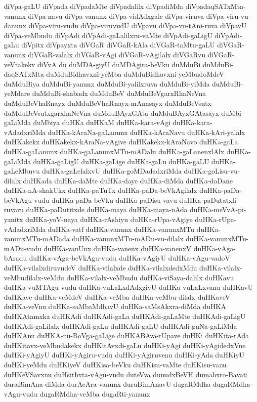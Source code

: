 {diVpa-gaLU
diVpada
diVpadaMte
diVpadalilx
diVpadiMda
diVpadaqSATxMta-vanunx
diVpa-navu
diVpa-vanunx
diVpa-vidAdxgale
diVpa-viruva
diVpa-viru-vu-danunx
diVpa-viru-vudu
diVpa-viruvudU
diVpavu
diVpa-vu-tAni-ruva
diVpavU
diVpa-veMbudu
diVpAdi
diVpAdi-gaLalilxru-vaMte
diVpAdi-gaLigU
diVpAdi-gaLu
diVpitx
diVpayxta
diVGaR
diVGaR-kAla
diVGaR-taMtu-gaLU
diVGaR-vanunx
diVGaR-valalx
diVGaR-vAgi
diVGaR-vAgilalx
diVGaRvu
diVGaR-veVtakekx
diVvA
du
duMDA-giyU
duMDAgira-beVku
duMduBi
duMduBi-daqSATxMta
duMduBidhavxni-yeMba
duMduBidhavxni-yeMbudoMdeV
duMduBiya
duMduBi-yanunx
duMduBi-yalilxruva
duMduBi-yiMda
duMduBi-yeMdare
duMduBi-shabadx
duMduBeV
duMduBeVgarxRhaNeVna
duMduBeVhaRnayx
duMduBeVhaRnayx-mAnasayx
duMduBeVsutx
duMduBeVsutxgarxhaNeVna
duMduBAyxGAta
duMduBAyxGAtasayx
duMbi-gaLiMda
duMbiya
duHKa
duHKaM
duHKa-kara-vAgi
duHKa-kara-vAdadxriMda
duHKa-kAraNa-gaLanunx
duHKa-kAraNavu
duHKa-kAri-yalalx
duHKakekx
duHKakekx-kAraNa-vAgive
duHKakekx-kAraNavo
duHKa-gaLa
duHKa-gaLanunx
duHKa-gaLanunxMTu-mADalu
duHKa-gaLanenxlAlx
duHKa-gaLiMda
duHKa-gaLigU
duHKa-gaLige
duHKa-gaLu
duHKa-gaLU
duHKa-gaLeMbuvu
duHKa-gaLelalxvU
duHKa-goMDadadxriMda
duHKa-goLisu-vu-dilalx
duHKada
duHKa-daMte
duHKa-daye
duHKa-diMda
duHKa-doDane
duHKa-nA-shakUkx
duHKa-paTuTx
duHKa-paDa-beVkAgilalx
duHKa-paDa-beVkAgu-vudu
duHKa-paDa-beVku
duHKa-paDisu-vavu
duHKa-paDutatxli-ruvaru
duHKa-paDutitxde
duHKa-maya
duHKa-maya-nAda
duHKa-meVvA-pi-yanitx
duHKa-yoV-naya
duHKa-rAshiyu
duHKa-rUpa-vAgiye
duHKa-rUpa-vAdadxriMda
duHKa-vatf
duHKa-vanunx
duHKa-vanunxMTu
duHKa-vanunxMTu-mADada
duHKa-vanunxMTu-mADu-vu-dilalx
duHKa-vanunxMTu-mADu-vudu
duHKa-vanUnx
duHKa-vanenx
duHKa-vanenxV
duHKa-vAga-bAradu
duHKa-vAga-beVkAgu-vudu
duHKa-vAgiyU
duHKa-vAgu-vadoV
duHKa-vilalxdiruvudeV
duHKa-vilalxde
duHKa-vilalxdedxMdu
duHKa-vilalx-veMbudilalx-veMdu
duHKa-vilalx-veMbudu
duHKa-viSaya-dalilx
duHKavu
duHKa-vuMTAgu-vudu
duHKa-vuLaLxdAdxgiyU
duHKa-vuLaLxvanu
duHKavU
duHKave
duHKa-veMdeV
duHKa-veMba
duHKa-veMbu-dilalx
duHKaveV
duHKa-veVnu
duHKa-saMbaMdhavU
duHKa-saMsAkxra-diMda
duHKA
duHKAtamxka
duHKAdi
duHKAdi-gaLa
duHKAdi-gaLaMte
duHKAdi-gaLigU
duHKAdi-gaLilalx
duHKAdi-gaLu
duHKAdi-gaLU
duHKAdi-guNa-gaLiMda
duHKAnu
duHKA-nu-BoVga-gaLige
duHKABAva-rUpave
duHKi
duHKita-rAda
duHKitavx-veMbudakekx
duHKitAvxdi-gaLu
duHKi-yAgi
duHKi-yAgidedxVne
duHKi-yAgiyU
duHKi-yAgiru-vudu
duHKi-yAgiruvenu
duHKi-yAda
duHKiyU
duHKi-yeMdu
duHKiyeV
duHKisa-beVku
duHKisu-vaMte
duHKisu-vanu
duHKeVSavxnu
duHsithxta-vAgu-vudu
duteVva
dunudxBeVH
dumabxro-Bavati
duraBimAna-diMda
durAcAra-vanunx
duruBimAnavU
dugaRMdha
dugaRMdha-vAgu-vudu
dugaRMdha-veMba
dugaRti-yanunx
}
